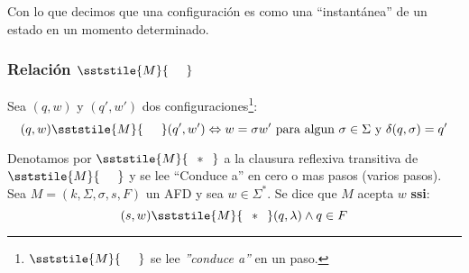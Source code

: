 \begin{itemize}
\begin{center}
\begin{minipage}[t]{.5\textwidth}
\end{minipage}
\end{center}
Con lo que decimos que una configuración es como una ``instantánea'' de un estado en un momento determinado.
\end{itemize}
\subsubsection{Relación $\sststile{M}{\hspace{0.25cm}  \hspace{0.25cm}}$}
Sea $(q,w)$ y $(q',w')$ dos configuraciones\footnote{$\sststile{M}{\hspace{0.25cm} \hspace{0.25cm}}$ se lee \textit{''conduce a''} en un paso.}:
$$
(q,w)\sststile{M}{\hspace{0.25cm} \hspace{0.25cm}} (q',w')\Leftrightarrow w = \sigma w' \text{ para algun } \sigma\in\Sigma \text{ y } \delta(q,\sigma)=q'
$$

Denotamos por $\sststile{M}{\hspace{0.25cm} * \hspace{0.25cm}}$ a la clausura reflexiva transitiva de $\sststile{M}{\hspace{0.25cm}  \hspace{0.25cm}}$ y se lee ``Conduce a'' en cero o mas pasos (varios pasos). \\${ }$\\
Sea $M=(k,\Sigma,\sigma,s,F)$ un AFD y sea $w\in\Sigma^*$. Se dice que $M$ acepta $w$ \textbf{ssi}:
$$
	(s,w) \sststile{M}{\hspace{0.25cm} * \hspace{0.25cm}} (q,\lambda) \wedge q\in F
$$
